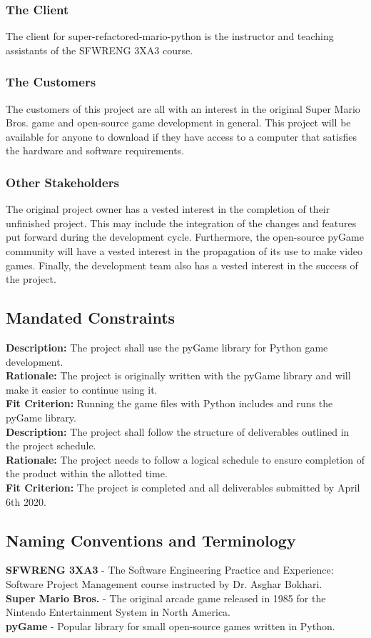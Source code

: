 \documentclass[12pt, titlepage]{article}
\begin{document}
\subsubsection{The Client}
    The client for super-refactored-mario-python is the instructor and teaching assistants of the SFWRENG 3XA3 course.
\subsubsection{The Customers}
    The customers of this project are all with an interest in the original Super Mario Bros. game and open-source game development in general. This project will be available for anyone to download if they have access to a computer that satisfies the hardware and software requirements.
\subsubsection{Other Stakeholders}
    The original project owner has a vested interest in the completion of their unfinished project. This may include the integration of the changes and features put forward during the development cycle. Furthermore, the open-source pyGame community will have a vested interest in the propagation of its use to make video games. Finally, the development team also has a vested interest in the success of the project.
\subsection{Mandated Constraints}
    \textbf{Description:} The project shall use the pyGame library for Python game development.\\
    \textbf{Rationale:} The project is originally written with the pyGame library and will make it easier to continue using it.\\
    \textbf{Fit Criterion:} Running the game files with Python includes and runs the pyGame library.\\
    \textbf{Description:} The project shall follow the structure of deliverables outlined in the project schedule.\\
    \textbf{Rationale:} The project needs to follow a logical schedule to ensure completion of the product within the allotted time.\\
    \textbf{Fit Criterion:} The project is completed and all deliverables submitted by April 6th 2020.
\subsection{Naming Conventions and Terminology}
    \textbf{SFWRENG 3XA3} - The Software Engineering Practice and Experience: Software Project Management course instructed by Dr. Asghar Bokhari.\\
    \textbf{Super Mario Bros.} - The original arcade game released in 1985 for the Nintendo Entertainment System in North America.\\
    \textbf{pyGame} - Popular library for small open-source games written in Python.\\
\end{document}
